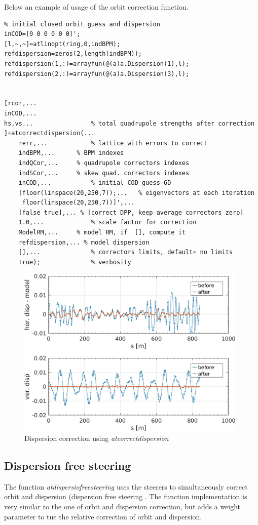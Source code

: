 Below an example of usage of the orbit correction function. 
\begin{lstlisting}
% initial closed orbit guess and dispersion
inCOD=[0 0 0 0 0 0]';
[l,~,~]=atlinopt(ring,0,indBPM);
refdispersion=zeros(2,length(indBPM));
refdispersion(1,:)=arrayfun(@(a)a.Dispersion(1),l);
refdispersion(2,:)=arrayfun(@(a)a.Dispersion(3),l);


[rcor,...
inCOD,...
hs,vs...   				% total quadrupole strengths after correction
]=atcorrectdispersion(...
    rerr,... 			% lattice with errors to correct
    indBPM,...		% BPM indexes
    indQCor,...	 	% quadrupole correctors indexes
    indSCor,...		% skew quad. correctors indexes	
    inCOD,...			% initial COD guess 6D
    [floor(linspace(20,250,7));...   % eigenvectors at each iteration
     floor(linspace(20,250,7))]',...
    [false true],... % [correct DPP, keep average correctors zero]
    1.0,...				% scale factor for correction
    ModelRM,...		% model RM, if  [], compute it
    refdispersion,... % model dispersion
    [],...				% correctors limits, default= no limits 
    true); 				% verbosity

\end{lstlisting}

\begin{figure}[!h]
	\centering
	\includegraphics[width=0.98\textwidth]{./images/corrections/DispCor.jpg}
	\caption{Dispersion correction using \emph{atcorrectdispersion}}
	\label{fig:orbitcor}
\end{figure}

\clearpage
\subsection{Dispersion free steering}
The function \emph{atdispersiofreesteering} uses the steerers to simultaneously correct orbit and dispersion (dispersion free steering \cite{DFS}. The function implementation is very similar to the one of orbit and dispersion correction, but adds a weight parameter to tue the relative correction of orbit and dispersion.

